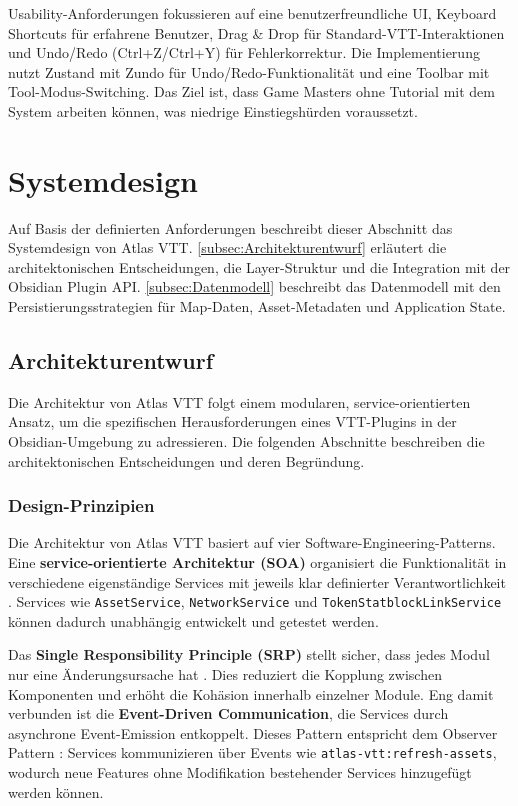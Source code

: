 Usability-Anforderungen fokussieren auf eine benutzerfreundliche \ac{UI}, Keyboard Shortcuts für erfahrene Benutzer, Drag \& Drop für Standard-\ac{VTT}-Interaktionen und Undo/Redo (Ctrl+Z/Ctrl+Y) für Fehlerkorrektur. Die Implementierung nutzt Zustand mit Zundo für Undo/Redo-Funktionalität und eine Toolbar mit Tool-Modus-Switching. Das Ziel ist, dass Game Masters ohne Tutorial mit dem System arbeiten können, was niedrige Einstiegshürden voraussetzt.

\section{Systemdesign}
\label{sec:Systemdesign}

Auf Basis der definierten Anforderungen beschreibt dieser Abschnitt das Systemdesign von Atlas \ac{VTT}. \autoref{subsec:Architekturentwurf} erläutert die architektonischen Entscheidungen, die Layer-Struktur und die Integration mit der Obsidian Plugin \ac{API}. \autoref{subsec:Datenmodell} beschreibt das Datenmodell mit den Persistierungsstrategien für Map-Daten, Asset-Metadaten und Application State.

\subsection{Architekturentwurf}
\label{subsec:Architekturentwurf}

Die Architektur von Atlas \ac{VTT} folgt einem modularen, service-orientierten Ansatz, um die spezifischen Herausforderungen eines \ac{VTT}-Plugins in der Obsidian-Umgebung zu adressieren. Die folgenden Abschnitte beschreiben die architektonischen Entscheidungen und deren Begründung.

\subsubsection{Design-Prinzipien}

Die Architektur von Atlas \ac{VTT} basiert auf vier Software-Engineering-Patterns. Eine \textbf{service-orientierte Architektur (\ac{SOA})} organisiert die Funktionalität in verschiedene eigenständige Services mit jeweils klar definierter Verantwortlichkeit \autocite{Fowler2014}. Services wie \texttt{AssetService}, \texttt{NetworkService} und \texttt{TokenStatblockLinkService} können dadurch unabhängig entwickelt und getestet werden.

Das \textbf{Single Responsibility Principle (\ac{SRP})} stellt sicher, dass jedes Modul nur eine Änderungsursache hat \autocite[S. 49-50]{ShvetsDesignPatterns}. Dies reduziert die Kopplung zwischen Komponenten und erhöht die Kohäsion innerhalb einzelner Module. Eng damit verbunden ist die \textbf{Event-Driven Communication}, die Services durch asynchrone Event-Emission entkoppelt. Dieses Pattern entspricht dem Observer Pattern \autocite{RefactoringGuruObserver}: Services kommunizieren über Events wie \texttt{atlas-vtt:refresh-assets}, wodurch neue Features ohne Modifikation bestehender Services hinzugefügt werden können.

